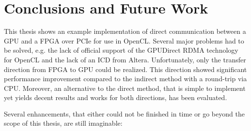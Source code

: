 \chapter{Conclusions and Future Work}
\label{section:conclusions}

This thesis shows an example implementation of direct communication between a GPU and a FPGA over PCIe for use in OpenCL.
Several major problems had to be solved, e.g. the lack of official support of the GPUDirect RDMA technology for OpenCL and the lack of an ICD from Altera.
Unfortunately, only the transfer direction from FPGA to GPU could be realized.
This direction showed significant performance improvement compared to the indirect method with a round-trip via CPU.
Moreover, an alternative to the direct method, that is simple to implement yet yields decent results and works for both directions, has been evaluated.


Several enhancements, that either could not be finished in time or go beyond the scope of this thesis, are still imaginable:


